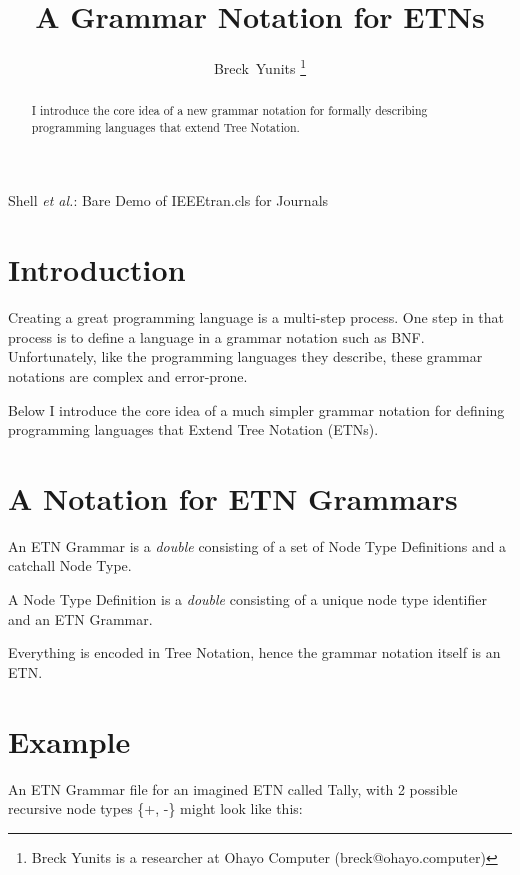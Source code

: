 \documentclass[journal]{IEEEtran}
\begin{document}
\title{A Grammar Notation for ETNs}

\author{Breck~Yunits%
\thanks{Breck Yunits is a researcher at Ohayo Computer (breck@ohayo.computer)}%
}

%
{Shell \MakeLowercase{\textit{et al.}}: Bare Demo of IEEEtran.cls for Journals}

\maketitle


\begin{abstract}
I introduce the core idea of a new grammar notation for formally describing programming languages that extend Tree Notation.
\end{abstract}

\IEEEpeerreviewmaketitle

\section{Introduction}

Creating a great programming language is a multi-step process. One step in that process is to define a language in a grammar notation such as BNF. Unfortunately, like the programming languages they describe, these grammar notations are complex and error-prone.

Below I introduce the core idea of a much simpler grammar notation for defining programming languages that Extend Tree Notation (ETNs).

\section{A Notation for ETN Grammars}

An ETN Grammar is a \textit{double} consisting of a set of Node Type Definitions and a catchall Node Type.

A Node Type Definition is a \textit{double} consisting of a unique node type identifier and an ETN Grammar.

Everything is encoded in Tree Notation, hence the grammar notation itself is an ETN.

\section{Example}

An ETN Grammar file for an imagined ETN called Tally, with 2 possible recursive node types \{+, -\} might look like this:
\end{document}
